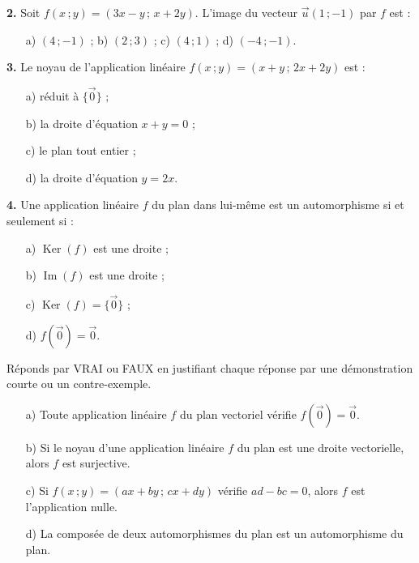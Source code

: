 \documentclass[11pt]{article}
\begin{document}
\begin{exercice}
\textbf{2.} Soit $f(x\,;y)=(3x-y\,;\,x+2y)$. L'image du vecteur $\vec{u}(1\,;-1)$ par $f$ est :
\begin{itemize}
\item[a)] $(4\,;-1)$ ; \qquad b) $(2\,;3)$ ; \qquad c) $(4\,;1)$ ; \qquad d) $(-4\,;-1)$.
\end{itemize}
\end{exercice}

\begin{exercice}
\textbf{3.} Le noyau de l'application linéaire $f(x\,;y)=(x+y\,;\,2x+2y)$ est :
\begin{itemize}
\item[a)] réduit à $\{\vec{0}\}$ ;
\item[b)] la droite d'équation $x+y=0$ ;
\item[c)] le plan tout entier ;
\item[d)] la droite d'équation $y=2x$.
\end{itemize}
\end{exercice}

\begin{exercice}
\textbf{4.} Une application linéaire $f$ du plan dans lui-même est un automorphisme si et seulement si :
\begin{itemize}
\item[a)] $\operatorname{Ker}(f)$ est une droite ;
\item[b)] $\operatorname{Im}(f)$ est une droite ;
\item[c)] $\operatorname{Ker}(f)=\{\vec{0}\}$ ;
\item[d)] $f(\vec{0})=\vec{0}$.
\end{itemize}
\end{exercice}

\begin{exercice}
Réponds par VRAI ou FAUX en justifiant chaque réponse par une démonstration courte ou un contre-exemple.
\begin{itemize}
\item[a)] Toute application linéaire $f$ du plan vectoriel vérifie $f(\vec{0})=\vec{0}$.
\item[b)] Si le noyau d'une application linéaire $f$ du plan est une droite vectorielle, alors $f$ est surjective.
\item[c)] Si $f(x\,;y)=(ax+by\,;\,cx+dy)$ vérifie $ad-bc=0$, alors $f$ est l'application nulle.
\item[d)] La composée de deux automorphismes du plan est un automorphisme du plan.
\end{itemize}
\end{exercice}
\end{document}
